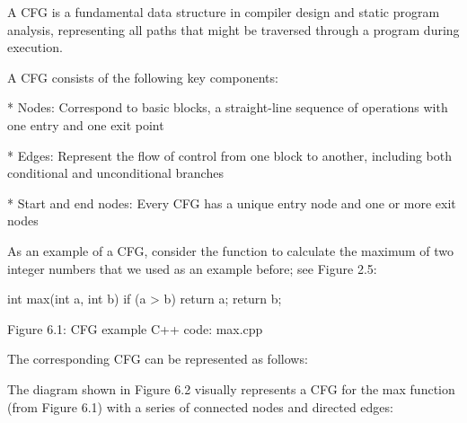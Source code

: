 A CFG is a fundamental data structure in compiler design and static program analysis, representing all paths that might be traversed through a program during execution.

A CFG consists of the following key components:

\begin{markdown}

* Nodes: Correspond to basic blocks, a straight-line sequence of operations with one entry and one exit point

* Edges: Represent the flow of control from one block to another, including both conditional and unconditional branches

* Start and end nodes: Every CFG has a unique entry node and one or more exit nodes
\end{markdown}

As an example of a CFG, consider the function to calculate the maximum of two integer numbers that we used as an example before; see Figure 2.5:

\begin{cpp}
int max(int a, int b) {
  if (a > b)
    return a;
  return b;
}
\end{cpp}

\begin{center}
Figure 6.1: CFG example C++ code: max.cpp
\end{center}

The corresponding CFG can be represented as follows:


The diagram shown in Figure 6.2 visually represents a CFG for the max function (from Figure 6.1) with a series of connected nodes and directed edges:

